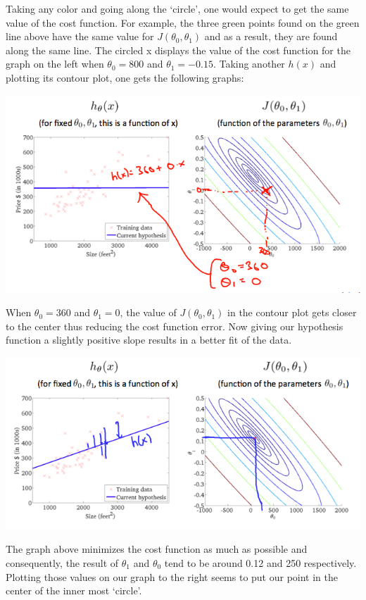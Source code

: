 \documentclass[UTF8]{article}
\begin{document}
Taking any color and going along the `circle', one would expect to get the same value of the cost function. For example, the three green points found on the green line above have the same value for $J(\theta_0,\theta_1)$ and as a result, they are found along the same line. The circled x displays the value of the cost function for the graph on the left when $\theta_0 = 800$ and $\theta_1= -0.15$. Taking another $h(x)$ and plotting its contour plot, one gets the following graphs:

\includegraphics[width = \textwidth]{NotePics/2_2_2_2.png}

When $\theta_0 = 360$ and $\theta_1 = 0$, the value of $J(\theta_0,\theta_1)$ in the contour plot gets closer to the center thus reducing the cost function error. Now giving our hypothesis function a slightly positive slope results in a better fit of the data.

\includegraphics[width = \textwidth]{NotePics/2_2_2_3.png}

The graph above minimizes the cost function as much as possible and consequently, the result of $\theta_1$ and $\theta_0$ tend to be around 0.12 and 250 respectively. Plotting those values on our graph to the right seems to put our point in the center of the inner most `circle'.
\end{document}
